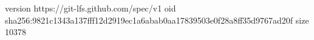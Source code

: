version https://git-lfs.github.com/spec/v1
oid sha256:9821c1343a137fff12d2919ec1a6abab0aa17839503e0f28a8ff35d9767ad20f
size 10378
